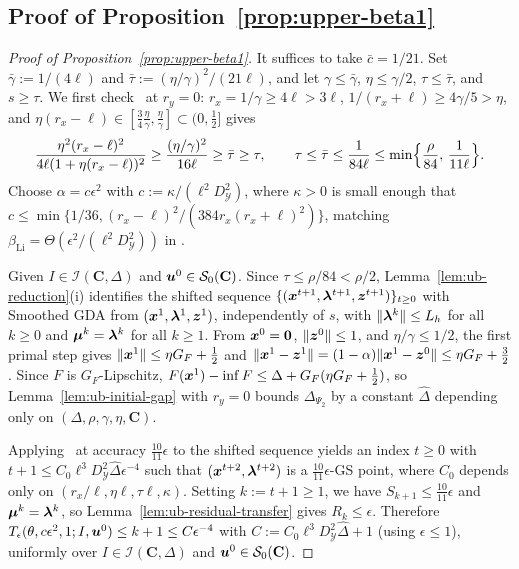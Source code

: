 \subsection{Proof of Proposition~\ref{prop:upper-beta1}}
\label{app:upper-beta1}

\begin{proof}[Proof of Proposition~\ref{prop:upper-beta1}]
It suffices to take \(\bar c=1/21\). Set \(\bar\gamma:=1/(4\ell)\) and \(\bar\tau:=(\eta/\gamma)^2/(21\ell)\), and
let \(\gamma\le\bar\gamma\), \(\eta\le\gamma/2\), \(\tau\le\bar\tau\), and
\(s\ge\tau\). We first check~\cite[Condition~3.2(i)]{li2026smoothing} at
\(r_y=0\): \(r_x=1/\gamma\ge4\ell>3\ell\), \(1/(r_x+\ell)\ge4\gamma/5>\eta\),
and \(\eta(r_x-\ell)\in[\frac34\frac\eta\gamma,\frac\eta\gamma]\subset(0,\frac12]\)
gives
\[
\frac{\eta^2(r_x-\ell)^2}{4\ell(1+\eta(r_x-\ell))^2}
\ge\frac{(\eta/\gamma)^2}{16\ell}\ge\bar\tau\ge\tau,
\qquad
\tau\le\bar\tau\le\frac1{84\ell}\le\min\Bigl\{\frac\rho{84},\,\frac1{11\ell}\Bigr\}.
\]
Choose \(\alpha=c\epsilon^2\) with \(c:=\kappa/(\ell^2D_{\mathcal Y}^2)\),
where \(\kappa>0\) is small enough that
\(c\le\min\{1/36,(r_x-\ell)^2/(384r_x(r_x+\ell)^2)\}\), matching
\(\beta_{\mathrm{Li}}=\Theta(\epsilon^2/(\ell^2D_{\mathcal Y}^2))\) in
\cite[Condition~3.2(i)]{li2026smoothing}.

Given \(I\in\mathcal I(\mathbf C,\Delta)\) and
\(\bm{u}^0\in\mathcal S_0(\mathbf C)\). Since \(\tau\le\rho/84<\rho/2\),
Lemma~\ref{lem:ub-reduction}(i) identifies the shifted sequence
\(\{(\bm{x}^{t+1},\bm{\lambda}^{t+1},\bm{z}^{t+1})\}_{t\ge0}\) with Smoothed GDA from
\((\bm{x}^1,\bm{\lambda}^1,\bm{z}^1)\), independently of \(s\), with
\(\|\bm{\lambda}^k\|\le L_h\) for all \(k\ge0\) and \(\bm{\mu}^k=\bm{\lambda}^k\) for all
\(k\ge1\). From \(\bm{x}^0=\bm{0}\), \(\|\bm{z}^0\|\le1\), and \(\eta/\gamma\le1/2\),
the first primal step gives \(\|\bm{x}^1\|\le\eta G_F+\frac12\) and
\(\|\bm{x}^1-\bm{z}^1\|=(1-\alpha)\|\bm{x}^1-\bm{z}^0\|\le\eta G_F+\frac32\). Since \(F\)
is \(G_F\)-Lipschitz, \(F(\bm{x}^1)-\inf F\le\Delta+G_F(\eta G_F+\frac12)\), so
Lemma~\ref{lem:ub-initial-gap} with \(r_y=0\) bounds \(\Delta_{\Psi_2}\) by a
constant \(\hat\Delta\) depending only on \((\Delta,\rho,\gamma,\eta,\mathbf C)\).

Applying~\cite[Theorem~B.1]{li2026smoothing} at accuracy \(\frac{10}{11}\epsilon\)
to the shifted sequence yields an index \(t\ge0\) with
\(t+1\le C_0\ell^3D_{\mathcal Y}^2\hat\Delta\epsilon^{-4}\) such that
\((\bm{x}^{t+2},\bm{\lambda}^{t+2})\) is a \(\frac{10}{11}\epsilon\)-GS point, where
\(C_0\) depends only on \((r_x/\ell,\eta\ell,\tau\ell,\kappa)\). Setting
\(k:=t+1\ge1\), we have \(S_{k+1}\le\frac{10}{11}\epsilon\) and
\(\bm{\mu}^k=\bm{\lambda}^k\), so Lemma~\ref{lem:ub-residual-transfer} gives
\(R_k\le\epsilon\). Therefore
\(T_\epsilon(\theta,c\epsilon^2,1;I,\bm{u}^0)\le k+1\le C\epsilon^{-4}\) with
\(C:=C_0\ell^3D_{\mathcal Y}^2\hat\Delta+1\) (using \(\epsilon\le1\)),
uniformly over \(I\in\mathcal I(\mathbf C,\Delta)\) and
\(\bm{u}^0\in\mathcal S_0(\mathbf C)\).
\end{proof}

